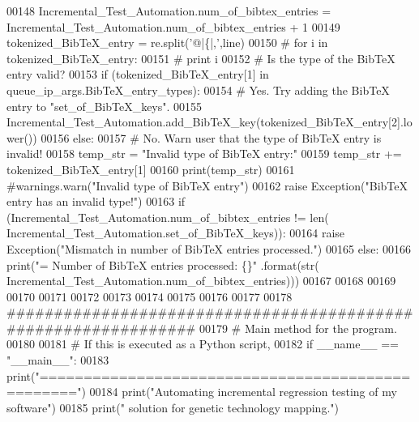 \begin{DoxyCode}
00148                 Incremental\_Test\_Automation.num\_of\_bibtex\_entries = 
      Incremental\_Test\_Automation.num\_of\_bibtex\_entries + 1
00149                 tokenized\_BibTeX\_entry = re.split(\textcolor{stringliteral}{'@|\{|,'},line)
00150 \textcolor{comment}{#               for i in tokenized\_BibTeX\_entry:}
00151 \textcolor{comment}{#                   print i}
00152                 \textcolor{comment}{# Is the type of the BibTeX entry valid?}
00153                 \textcolor{keywordflow}{if} (tokenized\_BibTeX\_entry[1] \textcolor{keywordflow}{in} queue\_ip\_args.BibTeX\_entry\_types):
00154                     \textcolor{comment}{# Yes. Try adding the BibTeX entry to "set\_of\_BibTeX\_keys".}
00155                     Incremental\_Test\_Automation.add\_BibTeX\_key(tokenized\_BibTeX\_entry[2].lower())
00156                 \textcolor{keywordflow}{else}:
00157                     \textcolor{comment}{# No. Warn user that the type of BibTeX entry is invalid!}
00158                     temp\_str = \textcolor{stringliteral}{"Invalid type of BibTeX entry:"}
00159                     temp\_str += tokenized\_BibTeX\_entry[1]
00160                     print(temp\_str)
00161                     \textcolor{comment}{#warnings.warn("Invalid type of BibTeX entry")}
00162                     \textcolor{keywordflow}{raise} Exception(\textcolor{stringliteral}{"BibTeX entry has an invalid type!"})
00163         \textcolor{keywordflow}{if} (Incremental\_Test\_Automation.num\_of\_bibtex\_entries != len(
      Incremental\_Test\_Automation.set\_of\_BibTeX\_keys)):
00164             \textcolor{keywordflow}{raise} Exception(\textcolor{stringliteral}{"Mismatch in number of BibTeX entries processed."})
00165         \textcolor{keywordflow}{else}:
00166             print(\textcolor{stringliteral}{"=    Number of BibTeX entries processed: \{\}"} .format(str(
      Incremental\_Test\_Automation.num\_of\_bibtex\_entries)))
00167 
00168 
00169 
00170 
00171 
00172 
00173 
00174 
00175 
00176 
00177 
00178 \textcolor{comment}{###############################################################}
00179 \textcolor{comment}{# Main method for the program.}
00180 
00181 \textcolor{comment}{#   If this is executed as a Python script,}
00182 \textcolor{keywordflow}{if} \_\_name\_\_ == \textcolor{stringliteral}{"\_\_main\_\_"}:
00183     print(\textcolor{stringliteral}{"=================================================="})
00184     print(\textcolor{stringliteral}{"Automating incremental regression testing of my software"})
00185     print(\textcolor{stringliteral}{" solution for genetic technology mapping."})

\end{DoxyCode}

